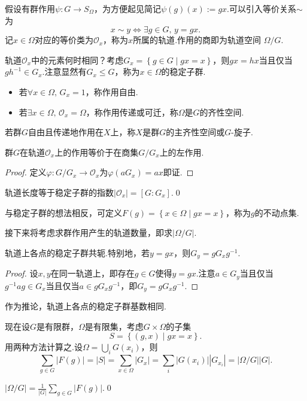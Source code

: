 假设有群作用$\psi\colon G\to S_\Omega$，为方便起见简记$\psi(g)(x):=gx$.可以引入等价关系$\sim$为
\[
	x\sim y\iff\exists g\in G,\,y=gx.
\]
记$x\in\Omega$对应的等价类为$\mathcal{O}_x$，称为$x$所属的{\heiti 轨道}.作用的{\heiti 商}即为{\heiti 轨道空间} $\Omega/G$.

轨道$\mathcal{O}_x$中的元素何时相同？考虑$G_x=\left\{g\in G\mid gx=x\right\}$，则$gx=hx$当且仅当$gh^{-1}\in G_x$.注意显然有$G_x\le G$，称为$x\in\Omega$的{\heiti 稳定子群}.

\begin{itemize}
	\item 若$\forall x\in\Omega,\,G_x=1$，称作用{\heiti 自由}.
	\item 若$\exists x\in\Omega,\,\mathcal{O}_x=\Omega$，称作用{\heiti 传递}或{\heiti 可迁}，称$\Omega$是$G$的{\heiti 齐性空间}.
\end{itemize}
\begin{remark}
	若群$G$自由且传递地作用在$X$上，称$X$是群$G$的{\heiti 主齐性空间}或$G${\heiti -旋子}.
\end{remark}
\begin{prop}
	群$G$在轨道$\mathcal{O}_x$上的作用等价于在商集\footnotemark $G/G_x$上的左作用.
\end{prop}
\begin{proof}
	定义$\varphi\colon G/G_x\to \mathcal{O}_x$为$\varphi(aG_x)=ax$即证.
\end{proof}
\begin{cor*}
	轨道长度等于稳定子群的指数$|\mathcal{O}_x|=[G:G_x]$.\qed
\end{cor*}

与稳定子群的想法相反，可定义$F(g)=\left\{x\in\Omega\mid gx=x\right\}$，称为$g$的{\heiti 不动点集}.

\medskip 接下来将考虑求群作用产生的轨道数量，即求$|\Omega/G|$.
\begin{lemma*}
	轨道上各点的稳定子群共轭.特别地，若$y=gx$，则$G_y=gG_xg^{-1}$.
\end{lemma*}
\begin{proof}
	设$x,y$在同一轨道上，即存在$g\in G$使得$y=gx$.注意$a\in G_y$当且仅当$g^{-1}ag\in G_x$当且仅当$a\in gG_xg^{-1}$，即$G_y=gG_xg^{-1}$.
\end{proof}

作为推论，轨道上各点的稳定子群基数相同.

现在设$G$是有限群，$\Omega$是有限集，考虑$G\times\Omega$的子集
\[
	S=\left\{(g,x)\mid gx=x\right\}.
\]
用两种方法计算之.设$\Omega=\bigcup_i G(x_i)$，则
\[
	\sum_{g\in G}|F(g)|=|S|=\sum_{x\in\Omega}|G_x|=\sum_i|G(x_i)||G_{x_i}|=|\Omega/G||G|.
\]
\begin{thm}[(Burnside引理)]
	$\displaystyle|\Omega/G|=\frac{1}{|G|}\sum_{g\in G}|F(g)|$.\qed
\end{thm}

